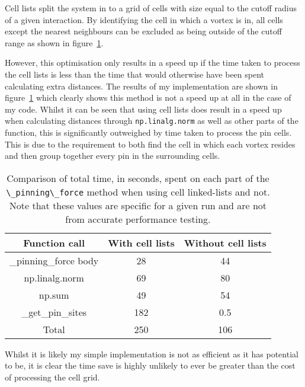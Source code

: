\documentclass[a4paper, twoside]{article}
\numberwithin{equation}{section}
\begin{document}
Cell lists split the system in to a grid of cells with size equal to the cutoff radius of a given interaction. By identifying the cell in which a vortex is in, all cells except the nearest neighbours can be excluded as being outside of the cutoff range as shown in figure~\ref{fig:cell_list}.
\begin{figure}[htb]
    \centering
    \caption{}
    \label{fig:cell_list}
\end{figure}

However, this optimisation only results in a speed up if the time taken to process the cell lists is less than the time that would otherwise have been spent calculating extra distances. The results of my implementation are shown in figure~\ref{tab:pin_force_profile} which clearly shows this method is not a speed up at all in the case of my code. Whilst it can be seen that using cell lists does result in a speed up when calculating distances through \lstinline{np.linalg.norm} as well as other parts of the function, this is significantly outweighed by time taken to process the pin cells. This is due to the requirement to both find the cell in which each vortex resides and then group together every pin in the surrounding cells. 
\begin{table}[htb]
    \centering
    \begin{tabular}{c|c|c}
        Function call & With cell lists & Without cell lists \\
        \hline
        \_pinning\_force body   & 28    & 44    \\
        np.linalg.norm          & 69    & 80    \\
        np.sum                  & 49    & 54    \\
        \_get\_pin\_sites       & 182   & 0.5   \\
        \hline
        Total                   & 250   & 106   \\
    \end{tabular}
    \caption{Comparison of total time, in seconds, spent on each part of the \lstinline{\_pinning\_force} method when using cell linked-lists and not. Note that these values are specific for a given run and are not from accurate performance testing.}
    \label{tab:pin_force_profile}
\end{table}
Whilst it is likely my simple implementation is not as efficient as it has potential to be, it is clear the time save is highly unlikely to ever be greater than the cost of processing the cell grid. 
\end{document}
